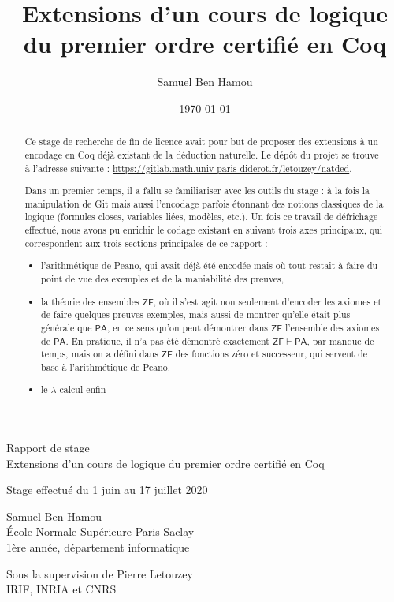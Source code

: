 \documentclass[a4paper]{article}
\title{Extensions d'un cours de logique du premier ordre certifié en Coq}
\author{Samuel Ben Hamou}
\date{\today}
\newcommand{\PA}{\mathsf{PA}}
\newcommand{\ZF}{\mathsf{ZF}}
\theoremstyle{remark}
\theoremstyle{remark}
\theoremstyle{remark}
\theoremstyle{definition}
\theoremstyle{definition}
\theoremstyle{definition}
\begin{document}
\begin{center}
    \vspace*{4em}
    {\LARGE Rapport de stage} \\ \vspace{1em}
    {\huge Extensions d'un cours de logique du premier ordre certifié en Coq} \\ \vspace{2em}
    
    {\Large Stage effectué du 1 juin au 17 juillet 2020} \\ \vspace{3em}
    
    {\Large Samuel Ben Hamou} \\
    {\large \'Ecole Normale Supérieure Paris-Saclay} \\ 
    {\large 1ère année, département informatique} \\ \vspace{2em}
    
    {\Large Sous la supervision de Pierre Letouzey} \\
    {\large IRIF, INRIA et CNRS} \vspace{2em}
\end{center}


\begin{abstract}
Ce stage de recherche de fin de licence avait pour but de proposer des extensions à un encodage en Coq déjà existant de la déduction naturelle. Le dépôt du projet se trouve à l'adresse suivante : \url{https://gitlab.math.univ-paris-diderot.fr/letouzey/natded}.

Dans un premier temps, il a fallu se familiariser avec les outils du stage : à la fois la manipulation de Git mais aussi l'encodage parfois étonnant des notions classiques de la logique (formules closes, variables liées, modèles, etc.). Un fois ce travail de défrichage effectué, nous avons pu enrichir le codage existant en suivant trois axes principaux, qui correspondent aux trois sections principales de ce rapport :
\begin{itemize}
\item l'arithmétique de Peano, qui avait déjà été encodée mais où tout restait à faire du point de vue des exemples et de la maniabilité des preuves,
\item la théorie des ensembles $\ZF$, où il s'est agit non seulement d'encoder les axiomes et de faire quelques preuves exemples, mais aussi de montrer qu'elle était plus générale que $\PA$, en ce sens qu'on peut démontrer dans $\ZF$ l'ensemble des axiomes de $\PA$. En pratique, il n'a pas été démontré exactement $\ZF \vdash \PA$, par manque de temps, mais on a défini dans $\ZF$ des fonctions zéro et successeur, qui servent de base à l'arithmétique de Peano.
\item le $\lambda$-calcul enfin
\end{itemize}
\end{abstract}
\end{document}
